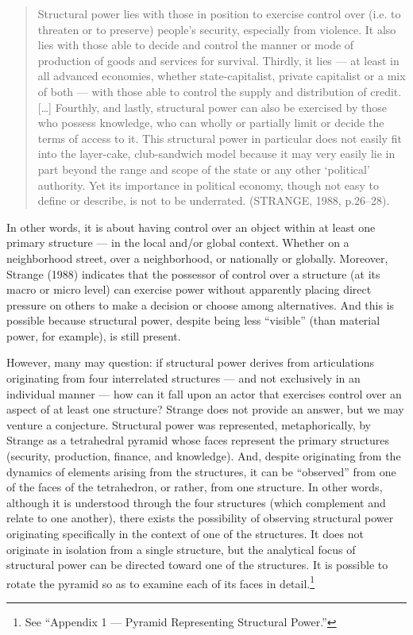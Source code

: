 \begin{quote}
Structural power lies with those in position to exercise control over (i.e. to threaten or to preserve) people's security, especially from violence. It also lies with those able to decide and control the manner or mode of production of goods and services for survival. Thirdly, it lies --- at least in all advanced economies, whether state-capitalist, private capitalist or a mix of both --- with those able to control the supply and distribution of credit. {[}\ldots{]} Fourthly, and lastly, structural power can also be exercised by those who possess knowledge, who can wholly or partially limit or decide the terms of access to it. This structural power in particular does not easily fit into the layer-cake, club-sandwich model because it may very easily lie in part beyond the range and scope of the state or any other `political' authority. Yet its importance in political economy, though not easy to define or describe, is not to be underrated. (STRANGE, 1988, p.26--28).
\end{quote}

In other words, it is about having control over an object within at least one primary structure --- in the local and/or global context. Whether on a neighborhood street, over a neighborhood, or nationally or globally. Moreover, Strange (1988) indicates that the possessor of control over a structure (at its macro or micro level) can exercise power without apparently placing direct pressure on others to make a decision or choose among alternatives. And this is possible because structural power, despite being less ``visible'' (than material power, for example), is still present.

However, many may question: if structural power derives from articulations originating from four interrelated structures --- and not exclusively in an individual manner --- how can it fall upon an actor that exercises control over an aspect of at least one structure? Strange does not provide an answer, but we may venture a conjecture. Structural power was represented, metaphorically, by Strange as a tetrahedral pyramid whose faces represent the primary structures (security, production, finance, and knowledge). And, despite originating from the dynamics of elements arising from the structures, it can be ``observed'' from one of the faces of the tetrahedron, or rather, from one structure. In other words, although it is understood through the four structures (which complement and relate to one another), there exists the possibility of observing structural power originating specifically in the context of one of the structures. It does not originate in isolation from a single structure, but the analytical focus of structural power can be directed toward one of the structures. It is possible to rotate the pyramid so as to examine each of its faces in detail.\footnote{See ``Appendix 1 --- Pyramid Representing Structural Power.''}


